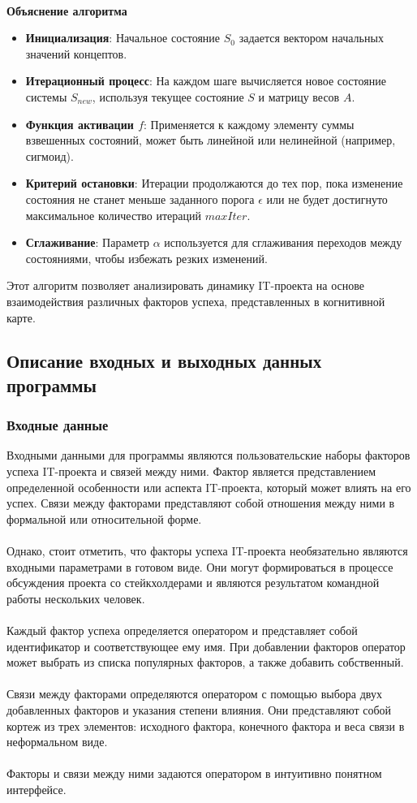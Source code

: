 \documentclass{article}
\begin{document}
    ~\\
    \textbf{Объяснение алгоритма}
    \begin{itemize}
        \item \textbf{Инициализация}: Начальное состояние $S_0$ задается вектором начальных значений концептов.
        \item \textbf{Итерационный процесс}: На каждом шаге вычисляется новое состояние системы $S_{new}$, используя текущее состояние $S$ и матрицу весов $A$.
        \item \textbf{Функция активации $f$}: Применяется к каждому элементу суммы взвешенных состояний, может быть линейной или нелинейной (например, сигмоид).
        \item \textbf{Критерий остановки}: Итерации продолжаются до тех пор, пока изменение состояния не станет меньше заданного порога $\epsilon$ или не будет достигнуто максимальное количество итераций $maxIter$.
        \item \textbf{Сглаживание}: Параметр $\alpha$ используется для сглаживания переходов между состояниями, чтобы избежать резких изменений.
    \end{itemize}
    Этот алгоритм позволяет анализировать динамику IT-проекта на основе взаимодействия различных факторов успеха, представленных в когнитивной карте.
    \subsection {Описание входных и выходных данных программы}

    \subsubsection{Входные данные}
    Входными данными для программы являются пользовательские наборы факторов успеха IT-проекта и связей между ними. Фактор является представлением определенной особенности или аспекта IT-проекта, который может влиять на его успех. Связи между факторами представляют собой отношения между ними в формальной или относительной форме.\\
    ~\\
    Однако, стоит отметить, что факторы успеха IT-проекта необязательно являются входными параметрами в готовом виде. Они могут формироваться в процессе обсуждения проекта со стейкхолдерами и являются результатом командной работы нескольких человек.\\
    ~\\
    Каждый фактор успеха определяется оператором и представляет собой идентификатор и соответствующее ему имя. При добавлении факторов оператор может выбрать из списка популярных факторов, а также добавить собственный.\\
    ~\\
    Связи между факторами определяются оператором с помощью выбора двух добавленных факторов и указания степени влияния. Они представляют собой кортеж из трех элементов: исходного фактора, конечного фактора и веса связи в неформальном виде.\\
    ~\\
    Факторы и связи между ними задаются оператором в интуитивно понятном интерфейсе.
\end{document}
